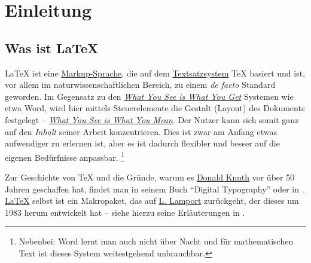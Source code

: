 \thispagestyle{empty}
\section{Einleitung}
% 
\subsection{Was ist \LaTeX{}}
\LaTeX{} ist eine \href{https://de.wikipedia.org/wiki/Auszeichnungssprache}{Markup-Sprache}, die auf dem \href{https://de.wikipedia.org/wiki/Satz_(Druck)}{Textsatzsystem} \TeX{} basiert und ist, vor allem im naturwissenschaftlichen Bereich, zu einem \emph{de facto} Standard geworden.
Im Gegensatz zu den \href{https://de.wikipedia.org/wiki/WYSIWYG}{\emph{What You See is What You Get}} Systemen wie etwa Word, wird hier mittels Steuerelemente die Gestalt (Layout) des Dokuments festgelegt 
-- \href{https://de.wikipedia.org/wiki/WYSIWYM}{\emph{What You See is What You Mean}}.
Der Nutzer kann sich somit ganz auf den \emph{Inhalt} seiner Arbeit konzentrieren.
Dies ist zwar am Anfang etwas aufwendiger zu erlernen ist, aber es ist dadurch flexibler und besser auf die eigenen Bedürfnisse anpassbar.%
\footnote{Nebenbei: Word lernt man auch nicht über Nacht und für mathematischen Text ist dieses System weitestgehend unbrauchbar.}

Zur Geschichte von \TeX{} und die Gründe, warum es \href{https://de.wikipedia.org/wiki/Donald_E._Knuth}{Donald Knuth} vor über 50 Jahren geschaffen hat, findet man in seinem Buch \enquote{Digital Typography} \cite{knuth:digital} oder in \textcite{beeton:math}.
\href{https://de.wikipedia.org/wiki/LaTeX}{\LaTeX{}} selbst ist ein Makropaket, das auf \href{https://de.wikipedia.org/wiki/Leslie_Lamport}{L. Lamport} zurückgeht, der dieses um 1983 herum entwickelt hat -- siehe hierzu seine Erläuterungen in \cite{lamport:dmv}.


